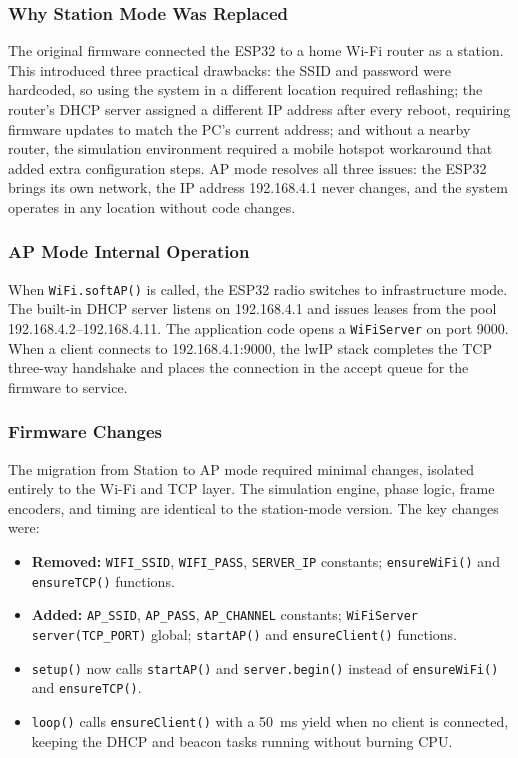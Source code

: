 \subsubsection*{Why Station Mode Was Replaced}

The original firmware connected the ESP32 to a home Wi-Fi router as a station. This introduced three practical drawbacks: the SSID and password were hardcoded, so using the system in a different location required reflashing; the router's DHCP server assigned a different IP address after every reboot, requiring firmware updates to match the PC's current address; and without a nearby router, the simulation environment required a mobile hotspot workaround that added extra configuration steps. AP mode resolves all three issues: the ESP32 brings its own network, the IP address 192.168.4.1 never changes, and the system operates in any location without code changes.

\subsubsection*{AP Mode Internal Operation}

When \texttt{WiFi.softAP()} is called, the ESP32 radio switches to infrastructure mode. The built-in DHCP server listens on 192.168.4.1 and issues leases from the pool 192.168.4.2--192.168.4.11. The application code opens a \texttt{WiFiServer} on port 9000. When a client connects to 192.168.4.1:9000, the lwIP stack completes the TCP three-way handshake and places the connection in the accept queue for the firmware to service.

\subsubsection*{Firmware Changes}

The migration from Station to AP mode required minimal changes, isolated entirely to the Wi-Fi and TCP layer. The simulation engine, phase logic, frame encoders, and timing are identical to the station-mode version. The key changes were:

\begin{itemize}
    \item \textbf{Removed:} \texttt{WIFI\_SSID}, \texttt{WIFI\_PASS}, \texttt{SERVER\_IP} constants; \texttt{ensureWiFi()} and \texttt{ensureTCP()} functions.
    \item \textbf{Added:} \texttt{AP\_SSID}, \texttt{AP\_PASS}, \texttt{AP\_CHANNEL} constants; \texttt{WiFiServer server(TCP\_PORT)} global; \texttt{startAP()} and \texttt{ensureClient()} functions.
    \item \texttt{setup()} now calls \texttt{startAP()} and \texttt{server.begin()} instead of \texttt{ensureWiFi()} and \texttt{ensureTCP()}.
    \item \texttt{loop()} calls \texttt{ensureClient()} with a 50~ms yield when no client is connected, keeping the DHCP and beacon tasks running without burning CPU.
\end{itemize}

